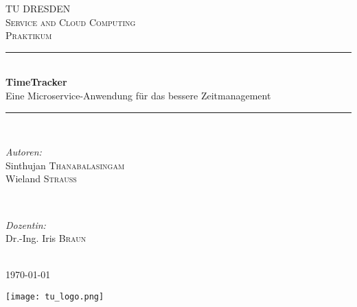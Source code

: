 \documentclass[12pt]{article} %
\begin{document}
\begin{titlepage}

\newcommand{\HRule}{\rule{\linewidth}{0.5mm}} %

\center

\textsc{\LARGE TU DRESDEN}\\[1.5cm] %
\textsc{\Large Service and Cloud Computing}\\[0.5cm] %
\textsc{\large Praktikum}\\[0.5cm] %

\HRule \\[0.4cm]
{ \huge \bfseries TimeTracker}\\[0.4cm] %

{Eine Microservice-Anwendung für das bessere Zeitmanagement}
\HRule \\[1.5cm]

\begin{minipage}{0.4\textwidth}
\begin{flushleft} 
\emph{Autoren:}\\
Sinthujan \textsc{Thanabalasingam}\\
Wieland \textsc{Strauß}
\end{flushleft}
\end{minipage}
~
\begin{minipage}{0.4\textwidth}
\begin{flushright} 
\emph{Dozentin:} \\
Dr.-Ing. Iris \textsc{Braun} %
\end{flushright}

\end{minipage}\\[3cm]


{\large \today}\\[3cm] %
\begin{center}
	\texttt{[image: tu\_logo.png]}
\end{center}

\vfill %

\end{titlepage}

\tableofcontents %

\newpage %






\end{document}
